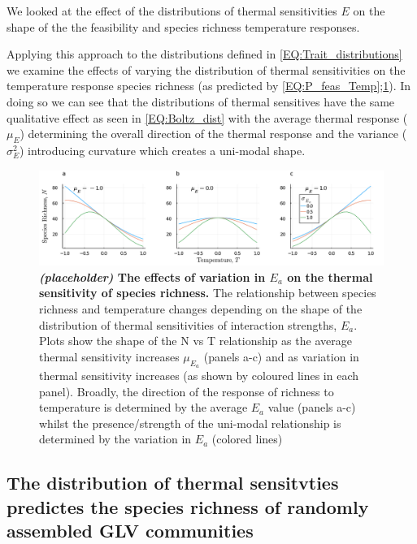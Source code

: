 \documentclass{article}
\begin{document}
We looked at the effect of the distributions of thermal sensitivities $E$ on the shape of the the feasibility and species richness temperature responses. 

 Applying this approach to the distributions defined in \cref{EQ:Trait_distributions} we examine the effects of varying the distribution of thermal sensitivities on the temperature response species richness (as predicted by \cref{EQ:P_feas_Temp};\cref{fig:Nsp_Temp}). In doing so we can see that the distributions of thermal sensitives have the same qualitative effect as seen in \cref{EQ:Boltz_dist} with the average thermal response ($\mu_E$) determining the overall direction of the thermal response and the variance ($\sigma_E^2$) introducing curvature which creates a uni-modal shape.

\begin{figure}
    \centering
    \includegraphics[width = \textwidth]{docs/Figures/Fig_Nsp_Temp.pdf}
    \caption{\textbf{\textit{(placeholder)} The effects of variation in $E_a$ on the thermal sensitivity of species richness.} The relationship between species richness and temperature changes depending on the shape of the distribution of thermal sensitivities of interaction strengths, $E_a$. Plots show the shape of the N vs T relationship as the average thermal sensitivity increases $\mu_{E_a}$ (panels a-c) and as variation in thermal sensitivity increases (as shown by coloured lines in each panel). Broadly, the direction of the response of richness to temperature is determined by the average $E_a$ value (panels a-c) whilst the presence/strength of the uni-modal relationship is determined by the variation in $E_a$ (colored lines) }
    \label{fig:Nsp_Temp}
\end{figure}

\subsection{The distribution of thermal sensitvties predictes the species richness of randomly assembled GLV communities}
\end{document}
